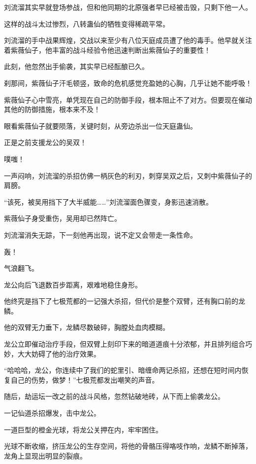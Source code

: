 
\begin{this_body}



刘流溜其实早就登场参战，但和他同期的北原强者早已经被击毁，只剩下他一人。

这样的战斗太过惨烈，八转蛊仙的牺牲变得稀疏平常。

刘流溜的手中战果辉煌，交战以来至少有八位天庭成员遭了他的毒手。他早就关注着紫薇仙子，他丰富的战斗经验令他迅速判断出紫薇仙子的重要性！

此刻，他忽然出手偷袭，其实早已经酝酿已久。

刹那间，紫薇仙子汗毛顿竖，致命的危机感觉充盈她的心胸，几乎让她不能呼吸！

紫薇仙子心中雪亮，单凭现在自己的防御手段，根本阻止不了对方。但要现在催动其他的防御措施，根本来不及！

眼看紫薇仙子就要陨落，关键时刻，从旁边杀出一位天庭蛊仙。

正是之前支援龙公的吴双！

噗嗤！

一声闷响，刘流溜的杀招仿佛一柄灰色的利刃，刺穿吴双之后，又刺中紫薇仙子的肩膀。

“该死，被吴用挡下了大半威能……”刘流溜面色骤变，身影迅速消散。

紫薇仙子身受重伤，吴用却已然阵亡。

刘流溜消失无踪，下一刻他再出现，说不定又会带走一条性命。

轰！

气浪翻飞。

龙公向后飞退数百步距离，艰难地稳住身形。

他终究是挡下了七极荒都的一记强大杀招，但代价是整个双臂，还有胸口前的龙鳞。

他的双臂无力垂下，龙鳞尽数破碎，胸膛处血肉模糊。

龙公立即催动治疗手段，但双臂上刻印下来的暗道道痕十分浓郁，并且排列组合巧妙，大大妨碍了他的治疗效果。

“哈哈哈，龙公，你连续中了我们的蛇里引、暗缠命两记杀招，还想在短时间内恢复自己的伤势，做梦！”七极荒都发出嘲笑的声音。

随后，劫运坛一改之前的战斗风格，忽然钻破地砖，从下而上偷袭龙公。

一记仙道杀招爆发，击中龙公。

一道巨型的橙金光球，将龙公关押在内，牢牢困住。

光球不断收缩，挤压龙公的生存空间，将他的骨骼压得咯吱作响，龙鳞不断掉落，龙角上显现出明显的裂痕。


\end{this_body}
